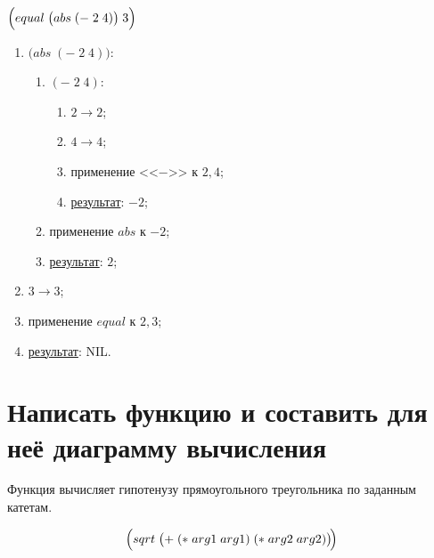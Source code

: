 \problem $\Bigl(equal\; \bigl(abs\; (-\; 2\; 4)\bigr)\; 3\Bigr)$

\begin{enumerate}
	\item $\bigl(abs\; (-\; 2\; 4)\bigr)$:
	\begin{enumerate}
		\item $(-\; 2\; 4)$:
		\begin{enumerate}
			\item $2 \to 2$;
			\item $4 \to 4$;
			\item применение <<$-$>> к $2, 4$;
			\item \underline{результат}: $-2$;
		\end{enumerate}
		\item применение $abs$ к $-2$;
		\item \underline{результат}: $2$;
	\end{enumerate}
	\item $3 \to 3$;
	\item применение $equal$ к $2, 3$;
	\item \underline{результат}: NIL.
\end{enumerate}
\vfill



\section{Написать функцию и составить для неё диаграмму вычисления}

\problem Функция вычисляет гипотенузу прямоугольного треугольника по заданным катетам.
\vfill

\vfill

\[
	\Bigl(sqrt\; \bigl(+\; (*\; arg1\; arg1)\; (*\; arg2\; arg2)\bigr)\!\Bigr)
\]
\vfill

